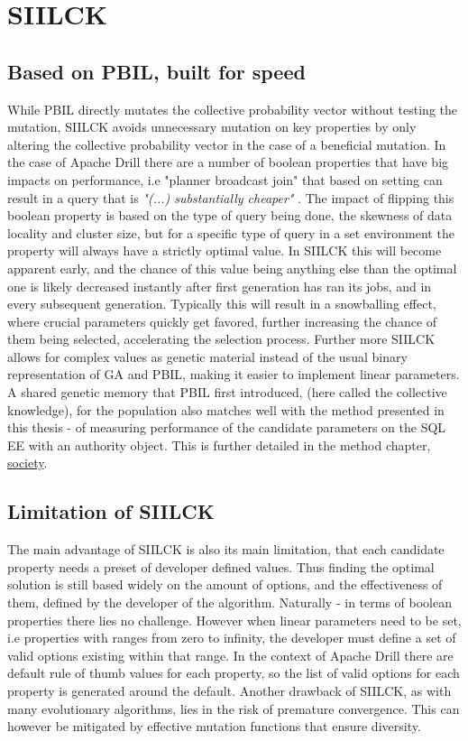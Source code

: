 \documentclass[a4paper,english]{report}
\begin{document}
	\section{SIILCK}
		\subsection{Based on PBIL, built for speed}
		While PBIL directly mutates the collective probability vector without testing the mutation, SIILCK avoids unnecessary mutation on key properties by only altering the collective probability vector in the case of a beneficial mutation. In the case of Apache Drill there are a number of boolean properties that have big impacts on performance, i.e "planner broadcast join" that based on setting can result in a query that is \textit{"(...) substantially cheaper"} \cite{joinplanning}. The impact of flipping this boolean property is based on the type of query being done, the skewness of data locality and cluster size, but for a specific type of query in a set environment the property will always have a strictly optimal value. In SIILCK this will become apparent early, and the chance of this value being anything else than the optimal one is likely decreased instantly after first generation has ran its jobs, and in every subsequent generation. Typically this will result in a snowballing effect, where crucial parameters quickly get favored, further increasing the chance of them being selected, accelerating the selection process. Further more SIILCK allows for complex values as genetic material instead of the usual binary representation of GA and PBIL, making it easier to implement linear parameters. A shared genetic memory that PBIL first introduced, (here called the collective knowledge), for the population also matches well with the method presented in this thesis - of measuring performance of the candidate parameters on the SQL EE with an authority object. This is further detailed in the method chapter, \hyperref[sec:society]{society}.
		\pagebreak
		\subsection{Limitation of SIILCK}
		The main advantage of SIILCK is also its main limitation, that each candidate property needs a preset of developer defined values. Thus finding the optimal solution is still based widely on the amount of options, and the effectiveness of them, defined by the developer of the algorithm. Naturally - in terms of boolean properties there lies no challenge. However when linear parameters need to be set, i.e properties with ranges from zero to infinity, the developer must define a set of valid options existing within that range. In the context of Apache Drill there are default rule of thumb values for each property, so the list of valid options for each property is generated around the default. Another drawback of SIILCK, as with many evolutionary algorithms, lies in the risk of premature convergence. This can however be mitigated by effective mutation functions that ensure diversity.
	\pagebreak
\end{document}
